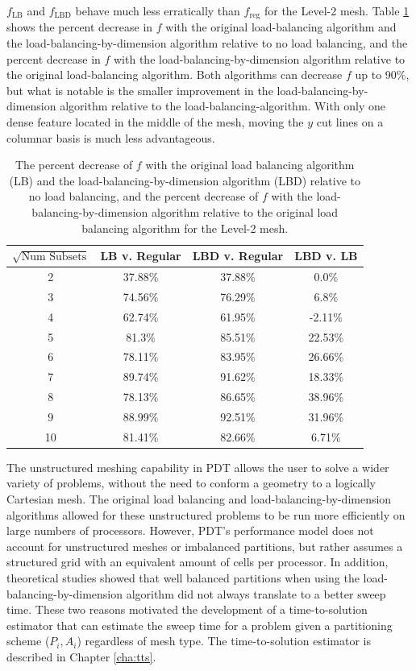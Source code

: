 $f_\text{LB}$ and $f_\text{LBD}$ behave much less erratically than $f_\text{reg}$ for the Level-2 mesh.
Table \ref{level2_metric_improvement} shows the percent decrease in $f$ with the original load-balancing algorithm and the load-balancing-by-dimension algorithm relative to no load balancing, and the percent decrease in $f$ with the load-balancing-by-dimension algorithm relative to the original load-balancing algorithm.
Both algorithms can decrease $f$ up to 90\%, but what is notable is the smaller improvement in the load-balancing-by-dimension algorithm relative to the load-balancing-algorithm.
With only one dense feature located in the middle of the mesh, moving the $y$ cut lines on a columnar basis is much less advantageous.
\begin{table}[ht]
\centering
\caption{The percent decrease of $f$ with the original load balancing algorithm (LB) and the load-balancing-by-dimension algorithm (LBD) relative to no load balancing, and the percent decrease of $f$ with the load-balancing-by-dimension algorithm relative to the original load balancing algorithm for the Level-2 mesh.}
\label{level2_metric_improvement}
\begin{tabular}{c|c|c|c}
\textbf{$\sqrt{\text{Num Subsets}}$} & \bf LB v. Regular  & \bf LBD v. Regular & \bf LBD v. LB \\ \hline
2&37.88\%&37.88\%&0.0\%\\ \hline
3&74.56\%&76.29\%&6.8\%\\ \hline
4&62.74\%&61.95\%&-2.11\%\\ \hline
5&81.3\%&85.51\%&22.53\%\\ \hline
6&78.11\%&83.95\%&26.66\%\\ \hline
7&89.74\%&91.62\%&18.33\%\\ \hline
8&78.13\%&86.65\%&38.96\%\\ \hline
9&88.99\%&92.51\%&31.96\%\\ \hline
10&81.41\%&82.66\%&6.71\%
\end{tabular}
\end{table}

\FloatBarrier
The unstructured meshing capability in PDT allows the user to solve a wider variety of problems, without the need to conform a geometry to a logically Cartesian mesh.
The original load balancing and load-balancing-by-dimension algorithms allowed for these unstructured problems to be run more efficiently on large numbers of processors.
However, PDT's performance model does not account for unstructured meshes or imbalanced partitions, but rather assumes a structured grid with an equivalent amount of cells per processor.
In addition, theoretical studies showed that well balanced partitions when using the load-balancing-by-dimension algorithm did not always translate to a better sweep time.
These two reasons motivated the development of a time-to-solution estimator that can estimate the sweep time for a problem given a partitioning scheme ($P_i, A_i$) regardless of mesh type. The time-to-solution estimator is described in Chapter \ref{cha:tts}.
